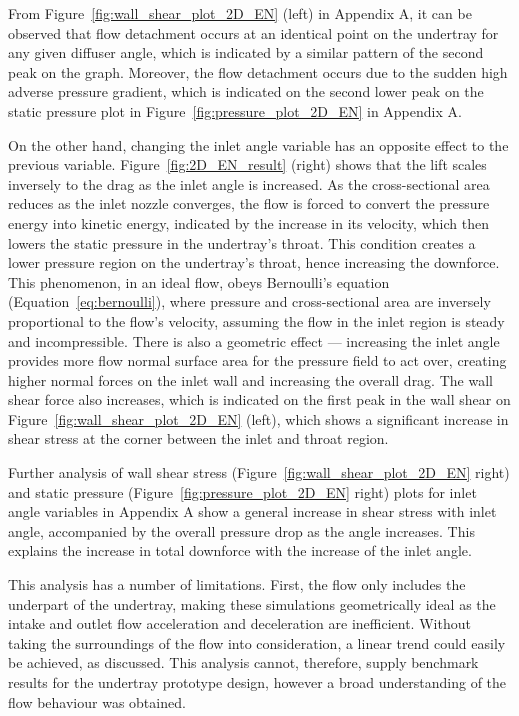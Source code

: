 \noindent From Figure~\ref{fig:wall_shear_plot_2D_EN} (left) in Appendix A, it can be observed that flow detachment occurs at an identical point on the undertray for any given diffuser angle, which is indicated by a similar pattern of the second peak on the graph. Moreover, the flow detachment occurs due to the sudden high adverse pressure gradient, which is indicated on the second lower peak on the static pressure plot in Figure~\ref{fig:pressure_plot_2D_EN} in Appendix A.

\noindent On the other hand, changing the inlet angle variable has an opposite effect to the previous variable. Figure~\ref{fig:2D_EN_result} (right) shows that the lift scales inversely to the drag as the inlet angle is increased. As the cross-sectional area reduces as the inlet nozzle converges, the flow is forced to convert the pressure energy into kinetic energy, indicated by the increase in its velocity, which then lowers the static pressure in the undertray's throat. This condition creates a lower pressure region on the undertray's throat, hence increasing the downforce. This phenomenon, in an ideal flow, obeys Bernoulli's equation (Equation~\ref{eq:bernoulli}), where pressure and cross-sectional area are inversely proportional to the flow's velocity, assuming the flow in the inlet region is steady and incompressible. There is also a geometric effect --- increasing the inlet angle provides more flow normal surface area for the pressure field to act over, creating higher normal forces on the inlet wall and increasing the overall drag. The wall shear force also increases, which is indicated on the first peak in the wall shear on Figure~\ref{fig:wall_shear_plot_2D_EN} (left), which shows a significant increase in shear stress at the corner between the inlet and throat region.

\noindent Further analysis of wall shear stress (Figure~\ref{fig:wall_shear_plot_2D_EN} right) and static pressure (Figure~\ref{fig:pressure_plot_2D_EN} right) plots for inlet angle variables in Appendix A show a general increase in shear stress with inlet angle, accompanied by the overall pressure drop as the angle increases. This explains the increase in total downforce with the increase of the inlet angle.

\noindent This analysis has a number of limitations. First, the flow only includes the underpart of the undertray, making these simulations geometrically ideal as the intake and outlet flow acceleration and deceleration are inefficient. Without taking the surroundings of the flow into consideration, a linear trend could easily be achieved, as discussed. This analysis cannot, therefore, supply benchmark results for the undertray prototype design, however a broad understanding of the flow behaviour was obtained.

